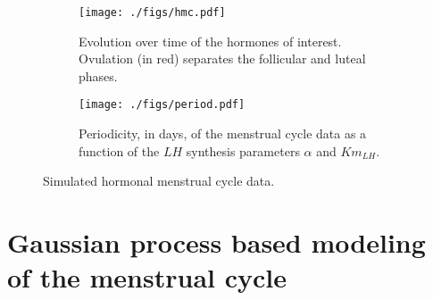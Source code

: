 \documentclass{article}
\begin{document}
\begin{figure}[!h]
        \centering
        \begin{subfigure}[b]{0.41\textwidth}
                \texttt{[image: ./figs/hmc.pdf]}
                \vspace*{-0.5cm}
                \caption{Evolution over time of the hormones of interest. Ovulation (in red) separates the follicular and luteal phases.}               
                \label{fig:hmc_data_example}
        \end{subfigure}
        \qquad
        \begin{subfigure}[b]{0.4\textwidth}
                \texttt{[image: ./figs/period.pdf]}
                \vspace*{-0.5cm}
                \caption{Periodicity, in days, of the menstrual cycle data as a function of the $LH$ synthesis parameters $\alpha$ and $Km_{LH}$.}
                \label{fig:hmc_data_periods}
        \end{subfigure}
        \caption{Simulated hormonal menstrual cycle data.}
        \label{fig:hmc_data}
\end{figure}

\vspace*{-0.5cm}
\section{Gaussian process based modeling of the  menstrual cycle}
\label{sec:hmc_gpm}
\end{document}
